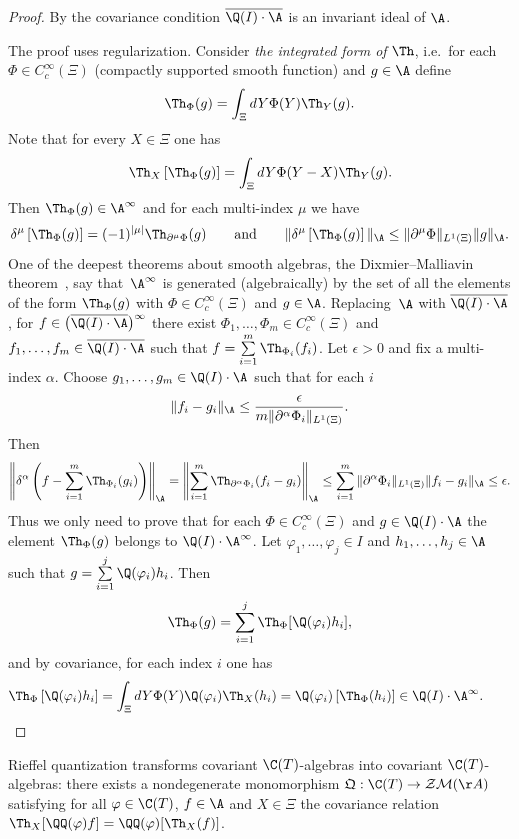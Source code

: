 \begin{proof}
By the covariance condition $\overline{\Q(I)\cdot\A}$ is an invariant ideal of $\A$.

The proof uses regularization. Consider {\it the integrated form of} $\Th$, i.e.\ for each $\Phi\in C_c^\infty(\Xi)$
(compactly supported smooth function) and $g\in\A$ def\/ine
\[
\Th_\Phi(g)=\int_\Xi dY\Phi(Y)\Th_Y(g).
\]
Note that for every $X\in\Xi$ one has
\[
\Th_X\left[\Th_\Phi(g)\right]=\int_\Xi dY\Phi(Y-X)\Th_Y(g).
\]
Then $\Th_\Phi(g)\in\A^\infty$ and for each multi-index $\mu$ we have
\[
\delta^{\mu}\left[\Th_\Phi(g)\right]=(-1)^{|\mu|}\Th_{\partial^{\mu}\Phi}(g)\qquad \text{and}\qquad
\|\delta^{\mu}\left[\Th_\Phi(g)\right]\|_\A \leq \|\partial^{\mu}\Phi\|_{L^1(\Xi)}
\| g\|_\A .
\]
One of the deepest theorems about smooth algebras, the Dixmier--Malliavin theorem~\cite{DM}, say that~$\A^\infty$
is generated (algebraically) by the set of all the elements of the form  $\Th_\Phi(g)$ with $\Phi\in C_c^\infty(\Xi)$ and
$g\in\A$. Replacing~$\A$ with $\overline{\Q(I)\cdot\A}$,
for $f\in\big(\overline{\Q(I)\cdot\A}\big)^\infty$ there exist $\Phi_1,\dots,\Phi_m\in C_c^\infty(\Xi)$ and
$f_1,\dots,f_m\in\overline{\Q(I)\cdot\A}$ such that $f=\sum\limits_{i=1}^m\Th_{\Phi_i}(f_i)$.
Let $\epsilon >0$ and f\/ix a multi-index $\alpha$. Choose $g_1,\dots ,g_m\in\Q(I)\cdot\A$ such that for each $i$
\[
\| f_i-g_i\|_\A \le\frac{\epsilon}{m\|\partial^\alpha\Phi_i\|_{L^1(\Xi)}} .
\]
Then
\begin{gather*}
\left\| \delta^\alpha \left(f-\sum_{i=1}^m\Th_{\Phi_i}(g_i)\right)\right\|_\A=
\left\|\sum_{i=1}^m\Th_{\partial^\alpha\Phi_i}(f_i-g_i)\right\|_\A
\leq
\sum_{i=1}^m\|\partial^\alpha\Phi_i\|_{L^1(\Xi)}\| f_i-g_i\|_\A \le\epsilon .
\end{gather*}
Thus we only need to prove that for each $\Phi\in C_c^\infty(\Xi)$ and $g\in\Q(I)\cdot\A$ the element
$\Th_\Phi(g)$ belongs to $\Q(I)\cdot\A^\infty$. Let $\varphi_1,\dots,\varphi_j\in I$ and
$h_1,\dots,h_j\in\A$ such that $g=\sum\limits_{i=1}^j\Q(\varphi_i)h_i$. Then
\[
\Th_\Phi(g)=\sum_{i=1}^j\Th_\Phi [\Q(\varphi_i)h_i ],
\]
and by covariance, for each index $i$ one has
\begin{gather*}
\Th_\Phi\left[\Q(\varphi_i)h_i\right]=\int_\Xi dY\Phi(Y)\Q(\varphi_i)\Th_X(h_i)=\Q(\varphi_i)
\left[\Th_\Phi(h_i)\right]\in\Q(I)\cdot\A^\infty .\tag*{\qed}
\end{gather*}
\renewcommand{\qed}{}
\end{proof}

\begin{Theorem}\label{crifel}
Rieffel quantization transforms covariant $\C(T)$-algebras into covariant $\C(T)$-algebras: there exists a nondegenerate
monomorphism $\mathfrak Q:\C(T)\rightarrow\mathcal Z\mathcal M(\AA)$ satisfying for all $\varphi\in\C(T)$, $f\in\A$ and
$X\in\Xi$ the covariance relation
$\Th_X[\QQ(\varphi)f]=\QQ(\varphi) [\Th_X(f) ]$.
\end{Theorem}

